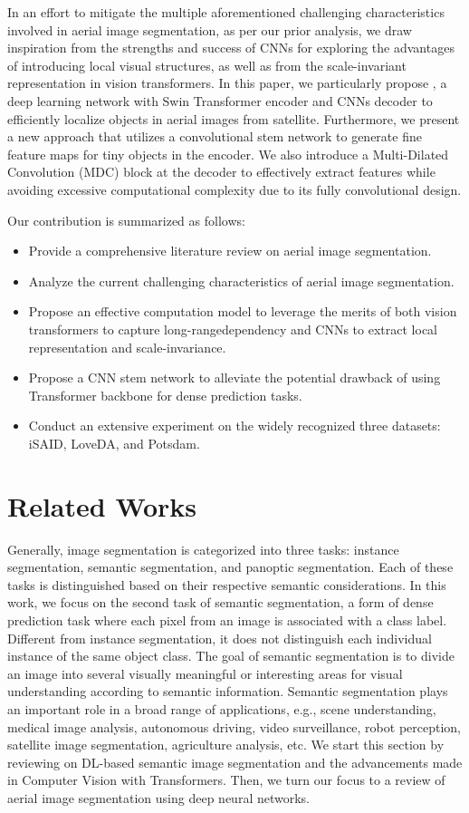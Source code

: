 \documentclass[journal]{IEEEtran}
\begin{document}
In an effort to mitigate the multiple aforementioned challenging characteristics involved in aerial image segmentation, as per our prior analysis, we draw inspiration from the strengths and success of CNNs for exploring the advantages of introducing local visual structures, as well as from the scale-invariant representation in vision transformers.
In this paper, we particularly propose \model, a deep learning network with Swin Transformer encoder and CNNs decoder to efficiently localize objects in aerial images from satellite. Furthermore, we present a new approach that 
utilizes a convolutional stem network to generate fine feature maps for tiny objects in the encoder. We also introduce a Multi-Dilated Convolution (MDC) block at the decoder to effectively extract features while avoiding excessive computational complexity due to its fully convolutional design.

Our contribution is summarized as follows:
\begin{itemize}
    \item Provide a comprehensive literature review on aerial image segmentation.
    \item Analyze the current challenging characteristics of aerial image segmentation.
    \item Propose an effective computation model to leverage the merits of both vision transformers to capture long-range\newpage dependency and CNNs to extract local representation and scale-invariance. 
    \item Propose a CNN stem network to alleviate the potential drawback of using Transformer backbone for dense prediction tasks.
    \item Conduct an extensive experiment on the widely recognized three datasets: iSAID, LoveDA, and Potsdam.
\end{itemize}



\section{Related Works}

Generally, image segmentation is categorized into three tasks: instance segmentation, semantic segmentation, and panoptic segmentation. Each of these tasks is distinguished based on their respective semantic considerations.
In this work, we focus on the second task of semantic segmentation, a form of dense prediction task where each pixel from an image is associated with a class label. Different from instance segmentation, it does not distinguish each individual instance of the same object class. The goal of semantic segmentation is to divide an image into several visually meaningful or interesting areas for visual understanding according to semantic information. Semantic segmentation plays an important role in a broad range of applications, e.g., scene understanding, medical image analysis, autonomous driving, video surveillance, robot perception, satellite image segmentation, agriculture analysis, etc. 
We start this section by reviewing on DL-based semantic image segmentation and the advancements made in Computer Vision with Transformers. Then, we turn our focus to a review of aerial image segmentation using deep neural networks.
\end{document}
